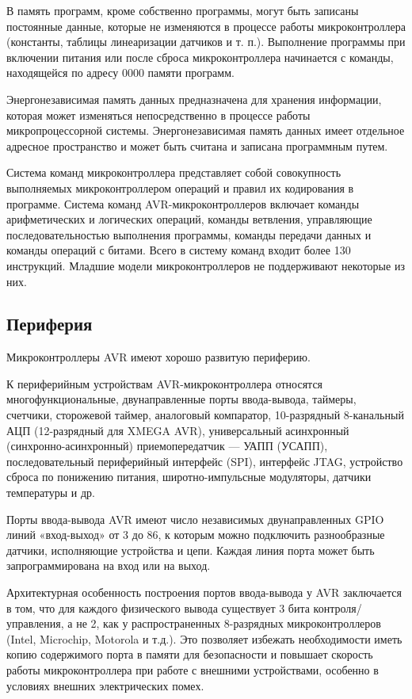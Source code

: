 \documentclass[12pt, oneside]{altsu-report}
\begin{document}
В память программ, кроме собственно программы, могут быть записаны постоянные данные, которые не изменяются в процессе работы микроконтроллера (константы, таблицы линеаризации датчиков и т. п.). Выполнение программы при включении питания или после сброса микроконтроллера начинается с команды, находящейся по адресу 0000 памяти программ.

Энергонезависимая память данных предназначена для хранения информации, которая может изменяться непосредственно в процессе работы микропроцессорной системы. Энергонезависимая память данных имеет отдельное адресное пространство и может быть считана и записана программным путем.

Система команд микроконтроллера представляет собой совокупность выполняемых микроконтроллером операций и правил их кодирования в программе. Система команд AVR-микроконтроллеров включает команды арифметических и логических операций, команды ветвления, управляющие последовательностью выполнения программы, команды передачи данных и команды операций с битами. Всего в систему команд входит более 130 инструкций. Младшие модели микроконтроллеров не поддерживают некоторые из них.

\subsection{Периферия}

Микроконтроллеры AVR имеют хорошо развитую периферию.

К периферийным устройствам AVR-микроконтроллера относятся многофункциональные, двунаправленные порты ввода-вывода, таймеры, счетчики, сторожевой таймер, аналоговый компаратор, 10-разрядный 8-канальный АЦП (12-разрядный для XMEGA AVR), универсальный асинхронный (синхронно-асинхронный) приемопередатчик --- УАПП (УСАПП), последовательный периферийный интерфейс (SPI), интерфейс JTAG, устройство сброса по понижению питания, широтно-импульсные модуляторы, датчики температуры и др.~\cite{wikiRUAVR}~\cite{kochegarov_trusov}

Порты ввода-вывода AVR имеют число независимых двунаправленных GPIO линий «вход-выход» от 3 до 86, к которым можно подключить разнообразные датчики, исполняющие устройства и цепи. Каждая линия порта может быть запрограммирована на вход или на выход.

Архитектурная особенность построения портов ввода-вывода у AVR заключается в том, что для каждого физического вывода существует 3 бита контроля/управления, а не 2, как у распространенных 8-разрядных микроконтроллеров (Intel, Microchip, Motorola и т.д.). Это позволяет избежать необходимости иметь копию содержимого порта в памяти для безопасности и повышает скорость работы микроконтроллера при работе с внешними устройствами, особенно в условиях внешних электрических помех.
\end{document}
